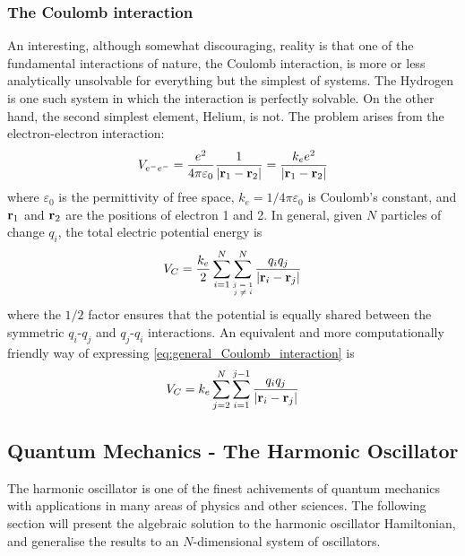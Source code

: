 \documentclass[nofootinbib,reprint,english]{revtex4-1}
\begin{document}
\subsubsection{The Coulomb interaction}
An interesting, although somewhat discouraging, reality is that one of the fundamental interactions of nature, the Coulomb interaction, is more or less analytically unsolvable for everything but the simplest of systems. The Hydrogen is one such system in which the interaction is perfectly solvable. On the other hand, the second simplest element, Helium, is not. The problem arises from the electron-electron interaction:
\begin{equation}\label{eq:electron_electron_Coulomb_interaction}
V_{e^-e^-}=\frac{e^2}{4\pi\varepsilon_0}\frac{1}{|\vb{r}_1-\vb{r}_2|}=\frac{k_ee^2}{|\vb{r}_1-\vb{r}_2|}
\end{equation}
where \(\varepsilon_0\) is the permittivity of free space, \(k_e=1/4\pi\varepsilon_0\) is Coulomb's constant, and \(\vb{r}_1\) and \(\vb{r}_2\) are the positions of electron 1 and 2. In general, given \(N\) particles of change \(q_i\), the total electric potential energy is
\begin{equation}\label{eq:general_Coulomb_interaction}
V_C=\frac{k_e}{2}\sum_{i=1}^N\sum_{{\tiny\mqty{j=1\\j\neq i}}}^N\frac{q_iq_j}{|\vb{r}_i-\vb{r}_j|}
\end{equation}
where the \(1/2\) factor ensures that the potential is equally shared between the symmetric \(q_i\)-\(q_j\) and \(q_j\)-\(q_i\) interactions. An equivalent and more computationally friendly way of expressing \eqref{eq:general_Coulomb_interaction} is
\begin{equation}\label{eq:general_Coulomb_interaction_friendly_expression}
V_C=k_e\sum_{j=2}^N\sum_{i=1}^{j-1}\frac{q_iq_j}{|\vb{r}_i-\vb{r}_j|}
\end{equation}
\subsection{Quantum Mechanics - The Harmonic Oscillator}
The harmonic oscillator is one of the finest achivements of quantum mechanics with applications in many areas of physics and other sciences. The following section will present the algebraic solution to the harmonic oscillator Hamiltonian, and generalise the results to an \(N\)-dimensional system of oscillators.
\end{document}
